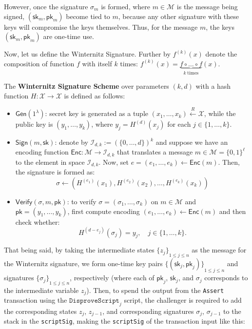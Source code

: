 \documentclass{iacrtrans}
\begin{document}
However, once the signature $\sigma_{m}$ is formed, where
$m \in \mathcal{M}$ is the message being signed,
\((\mathsf{sk}_{m}, \mathsf{pk}_{m})\) become tied to \(m\), because
any other signature with these keys will compromise the keys
themselves. Thus, for the message \(m\), the keys
\((\mathsf{sk}_{m}, \mathsf{pk}_{m})\) are one-time use.

Now, let us define the Winternitz Signature. Further by $f^{(k)}(x)$
denote the composition of function $f$ with itself $k$ times:
$f^{(k)}(x) = \underbrace{f \circ \dots \circ f}_{k \; \text{times}}(x)$.

\begin{definition}
  The \textbf{Winternitz Signature Scheme} over parameters $(k,d)$
  with a hash function $H: \mathcal{X} \to \mathcal{X}$ is defined as follows:
  \begin{itemize}
    \item $\mathsf{Gen}(1^{\lambda})$: secret key is generated as a tuple
      $(x_1,\dots,x_k) \xleftarrow{R} \mathcal{X}$, while the public key is
      $(y_1,\dots,y_k)$, where $y_j = H^{(d)}(x_j)$ for each
      $j \in \{1,\dots,k\}$.
    \item $\mathsf{Sign}(m,\mathsf{sk})$: denote by
      $\mathcal{I}_{d,k} := {(\{0,\dots,d\})}^k$ and suppose we have an encoding
      function $\mathsf{Enc}: \mathcal{M} \to \mathcal{I}_{d,k}$ that
      translates a message
      $m \in \mathcal{M} = {\{0,1\}}^{\ell}$ to the element in space
      $\mathcal{I}_{d,k}$. Now, set
      $e = (e_1,\dots,e_k) \gets \mathsf{Enc}(m)$. Then, the signature is
      formed as:
      \begin{equation*}
        \sigma \gets ({H}^{(e_1)}(x_1), H^{(e_2)}(x_2), \dots, H^{(e_k)}(x_k))
      \end{equation*}
    \item $\mathsf{Verify}(\sigma,m,\mathsf{pk})$: to verify
      $\sigma = (\sigma_1,\dots,\sigma_k)$ on $m \in \mathcal{M}$ and
      $\mathsf{pk}=(y_1,\dots,y_k)$, first compute encoding
      $(e_1,\dots,e_k) \gets \mathsf{Enc}(m)$ and then check whether:
      \begin{equation*}
        H^{(d-e_j)}(\sigma_j) = y_j, \quad j \in \{1,\dots,k\}.
      \end{equation*}
  \end{itemize}
\end{definition}

That being said, by taking the intermediate states
${\{z_j\}}_{1 \leq j \leq n}$ as the message for the Winternitz signature, we
form one-time key pairs
${\{(\mathsf{sk}_j,\mathsf{pk}_j)\}}_{1 \leq j \leq n}$ and signatures
${\{\sigma_j\}}_{1 \leq j \leq n}$, respectively (where each of
  $\mathsf{pk}_j$, $\mathsf{sk}_j$, and $\sigma_j$ corresponds to the
intermediate variable $z_j$). Then, to spend the output from the
\texttt{Assert} transaction using the $\texttt{DisproveScript}_j$
script, the challenger is required to add the corresponding states
$z_j$, $z_{j-1}$, and corresponding signatures $\sigma_j$,
$\sigma_{j-1}$ to the stack in the \texttt{scriptSig}, making the
\texttt{scriptSig} of the transaction input like this:
\end{document}
